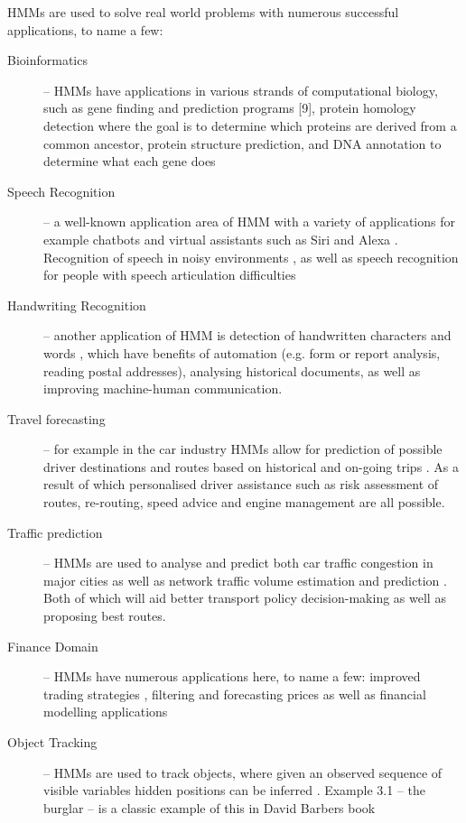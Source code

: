 HMMs are used to solve real world problems with numerous successful applications, to name a few:
\begin{description}
  \item[Bioinformatics] -- HMMs have applications in various strands of computational biology, such as gene finding and prediction programs [9], protein homology detection where the goal is to determine which proteins are derived from a common ancestor, protein structure prediction, and DNA annotation to determine what each gene does \autocite{choo2004recent}
  \item[Speech Recognition] -- a well-known application area of HMM with a variety of applications for example chatbots and virtual assistants such as Siri and Alexa \autocite{cahn2017chatbot}. Recognition of speech in noisy environments \autocite{acero2000hmm}, as well as speech recognition for people with speech articulation difficulties \autocite{ballati2018hey}
  \item[Handwriting Recognition] -- another application of HMM is detection of handwritten characters and words \autocite{hu18textordfemininehmm}, which have benefits of automation (e.g. form or report analysis, reading postal addresses), analysing historical documents, as well as improving machine-human communication.
  \item[Travel forecasting] -- for example in the car industry HMMs allow for prediction of possible driver destinations and routes based on historical and on-going trips \autocite{lassoued2017hidden}. As a result of which personalised driver assistance such as risk assessment of routes, re-routing, speed advice and engine management are all possible.
  \item[Traffic prediction] -- HMMs are used to analyse and predict both car traffic congestion in major cities \autocite{zaki2016framework} as well as network traffic volume estimation and prediction \autocite{chen2016predicting}. Both of which will aid better transport policy decision-making as well as proposing best routes.
  \item[Finance Domain] -- HMMs have numerous applications here, to name a few: improved trading strategies \autocite{tenyakov2017computing}, filtering and forecasting prices \autocite{date2013filtering} as well as financial modelling applications \autocite{tenyakov2016modelling}
  \item[Object Tracking] -- HMMs are used to track objects, where given an observed sequence of visible variables hidden positions can be inferred \autocite{barberBRML2012}. Example 3.1 -- the burglar -- is a classic example of this in David Barbers book \autocite{barberBRML2012}
\end{description}


